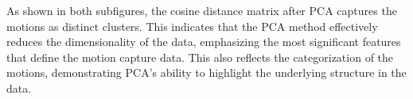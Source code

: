 As shown in both subfigures, the cosine distance matrix after PCA captures the motions as distinct clusters. This indicates that the PCA method effectively reduces the dimensionality of the data, emphasizing the most significant features that define the motion capture data. This also reflects the categorization of the motions, demonstrating PCA's ability to highlight the underlying structure in the data.
